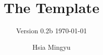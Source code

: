 \documentclass{litebook}
\title{The \pkg{LiteBook} Template}
\subtitle{Version 0.2b \today}
\author{Hsia Mingyu}
\begin{document}
\let\theremark=\relax
\def\theproblem{\arabic{problem}}
\def\theexample{\arabic{example}}
\let\thesolution=\relax

\maketitle
\frontmatter
\tableofcontents
\mainmatter


\end{document}
